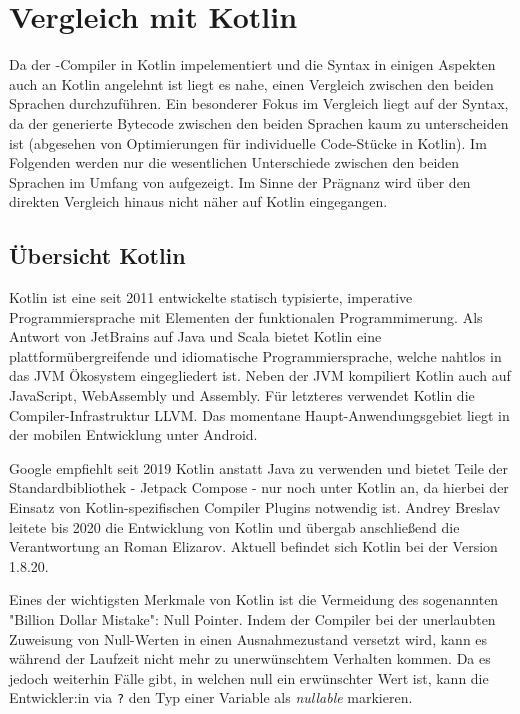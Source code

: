 \chapter{Vergleich mit Kotlin}
\label{cha:comparison}

Da der \toya-Compiler in Kotlin impelementiert und die Syntax in einigen Aspekten auch an Kotlin angelehnt ist liegt es nahe, einen Vergleich zwischen den beiden Sprachen durchzuführen. Ein besonderer Fokus im Vergleich liegt auf der Syntax, da der generierte Bytecode zwischen den beiden Sprachen kaum zu unterscheiden ist (abgesehen von Optimierungen für individuelle Code-Stücke in Kotlin). Im Folgenden werden nur die wesentlichen Unterschiede zwischen den beiden Sprachen im Umfang von \toya aufgezeigt. Im Sinne der Prägnanz wird über den direkten Vergleich hinaus nicht näher auf Kotlin eingegangen.

\section{Übersicht Kotlin}
Kotlin ist eine seit 2011 entwickelte statisch typisierte, imperative Programmiersprache mit Elementen der funktionalen Programmimerung. Als Antwort von JetBrains auf Java und Scala bietet Kotlin eine plattformübergreifende und idiomatische Programmiersprache, welche nahtlos in das JVM Ökosystem eingegliedert ist. Neben der JVM kompiliert Kotlin auch auf JavaScript, WebAssembly und Assembly. Für letzteres verwendet Kotlin die Compiler-Infrastruktur LLVM. Das momentane Haupt-Anwendungsgebiet liegt in der mobilen Entwicklung unter Android.

Google empfiehlt seit 2019 Kotlin anstatt Java zu verwenden und bietet Teile der Standardbibliothek - Jetpack Compose - nur noch unter Kotlin an, da hierbei der Einsatz von Kotlin-spezifischen Compiler Plugins notwendig ist. Andrey Breslav leitete bis 2020 die Entwicklung von Kotlin und übergab anschließend die Verantwortung an Roman Elizarov. Aktuell befindet sich Kotlin bei der Version 1.8.20.

Eines der wichtigsten Merkmale von Kotlin ist die Vermeidung des sogenannten "Billion Dollar Mistake": Null Pointer. Indem der Compiler bei der unerlaubten Zuweisung von Null-Werten in einen Ausnahmezustand versetzt wird, kann es während der Laufzeit nicht mehr zu unerwünschtem Verhalten kommen. Da es jedoch weiterhin Fälle gibt, in welchen null ein erwünschter Wert ist, kann die Entwickler:in via \texttt{?} den Typ einer Variable als \textit{nullable} markieren.

